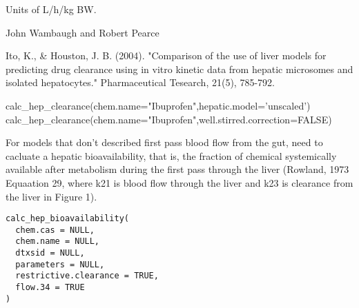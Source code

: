 \documentclass[a4paper]{book}
\begin{document}
%
\begin{Value}
\begin{ldescription}
\item[\code{Hepatic Clearance}] Units of L/h/kg BW.
\end{ldescription}
\end{Value}
%
\begin{Author}\relax
John Wambaugh and Robert Pearce
\end{Author}
%
\begin{References}\relax
Ito, K., \& Houston, J. B. (2004). "Comparison of the use of liver models for 
predicting drug clearance using in vitro kinetic data from hepatic microsomes 
and isolated hepatocytes." Pharmaceutical Tesearch, 21(5), 785-792.
\end{References}
%
\begin{Examples}
\begin{ExampleCode}

calc_hep_clearance(chem.name="Ibuprofen",hepatic.model='unscaled')
calc_hep_clearance(chem.name="Ibuprofen",well.stirred.correction=FALSE)


\end{ExampleCode}
\end{Examples}
%
\begin{Description}\relax
For models that don't described first pass blood flow from the gut, need to
cacluate a hepatic bioavailability, that is, the fraction of chemical 
systemically available after metabolism during the first pass through the 
liver (Rowland, 1973 Equaation 29, where k21 is blood flow through the liver
and k23 is clearance from the liver in Figure 1).
\end{Description}
%
\begin{Usage}
\begin{verbatim}
calc_hep_bioavailability(
  chem.cas = NULL,
  chem.name = NULL,
  dtxsid = NULL,
  parameters = NULL,
  restrictive.clearance = TRUE,
  flow.34 = TRUE
)
\end{verbatim}
\end{Usage}
%
\end{document}

